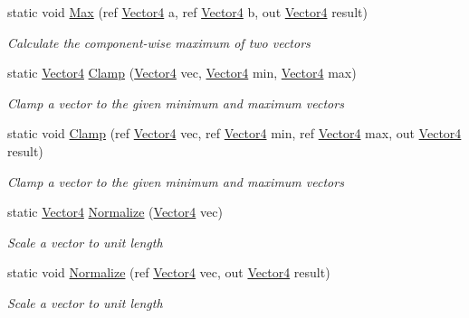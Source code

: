 \begin{DoxyCompactItemize}
static void \hyperlink{struct_open_t_k_1_1_vector4_a920b1cbab191da494c72550f67910d28}{Max} (ref \hyperlink{struct_open_t_k_1_1_vector4}{Vector4} a, ref \hyperlink{struct_open_t_k_1_1_vector4}{Vector4} b, out \hyperlink{struct_open_t_k_1_1_vector4}{Vector4} result)
\begin{DoxyCompactList}\small\item\em Calculate the component-\/wise maximum of two vectors \end{DoxyCompactList}\item 
static \hyperlink{struct_open_t_k_1_1_vector4}{Vector4} \hyperlink{struct_open_t_k_1_1_vector4_aa291d49a4b21f9857bfcf7c3d46f292a}{Clamp} (\hyperlink{struct_open_t_k_1_1_vector4}{Vector4} vec, \hyperlink{struct_open_t_k_1_1_vector4}{Vector4} min, \hyperlink{struct_open_t_k_1_1_vector4}{Vector4} max)
\begin{DoxyCompactList}\small\item\em Clamp a vector to the given minimum and maximum vectors \end{DoxyCompactList}\item 
static void \hyperlink{struct_open_t_k_1_1_vector4_aa40d7ccae7c55645a02462208780d60d}{Clamp} (ref \hyperlink{struct_open_t_k_1_1_vector4}{Vector4} vec, ref \hyperlink{struct_open_t_k_1_1_vector4}{Vector4} min, ref \hyperlink{struct_open_t_k_1_1_vector4}{Vector4} max, out \hyperlink{struct_open_t_k_1_1_vector4}{Vector4} result)
\begin{DoxyCompactList}\small\item\em Clamp a vector to the given minimum and maximum vectors \end{DoxyCompactList}\item 
static \hyperlink{struct_open_t_k_1_1_vector4}{Vector4} \hyperlink{struct_open_t_k_1_1_vector4_ae78e4a3e6de7f55f32cc82720d2b1dc3}{Normalize} (\hyperlink{struct_open_t_k_1_1_vector4}{Vector4} vec)
\begin{DoxyCompactList}\small\item\em Scale a vector to unit length \end{DoxyCompactList}\item 
static void \hyperlink{struct_open_t_k_1_1_vector4_a56913087b5fa018854e0dfa6b980c767}{Normalize} (ref \hyperlink{struct_open_t_k_1_1_vector4}{Vector4} vec, out \hyperlink{struct_open_t_k_1_1_vector4}{Vector4} result)
\begin{DoxyCompactList}\small\item\em Scale a vector to unit length \end{DoxyCompactList}\item 

\end{DoxyCompactItemize}
